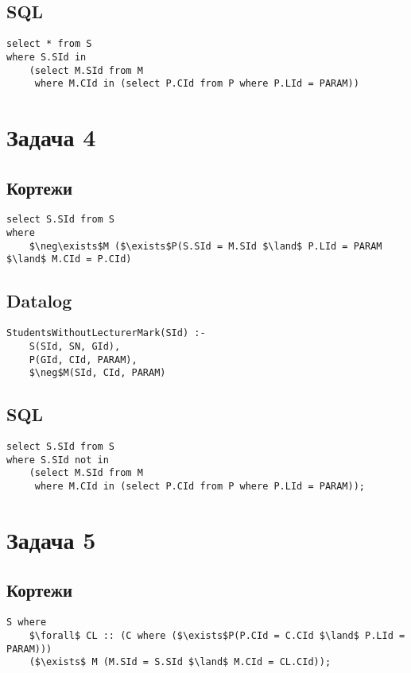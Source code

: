 \documentclass{article}
\begin{document}
\subsection{SQL}
\begin{lstlisting}[mathescape=true]
select * from S
where S.SId in
    (select M.SId from M
     where M.CId in (select P.CId from P where P.LId = PARAM))
\end{lstlisting}



\section{Задача 4}

\subsection{Кортежи}
\begin{lstlisting}[mathescape=true]
select S.SId from S
where
    $\neg\exists$M ($\exists$P(S.SId = M.SId $\land$ P.LId = PARAM $\land$ M.CId = P.CId)
\end{lstlisting}

\subsection{Datalog}
\begin{lstlisting}[mathescape=true]
StudentsWithoutLecturerMark(SId) :-
    S(SId, SN, GId),
    P(GId, CId, PARAM),
    $\neg$M(SId, CId, PARAM)
\end{lstlisting}


\subsection{SQL}
\begin{lstlisting}[mathescape=true]
select S.SId from S
where S.SId not in
    (select M.SId from M
     where M.CId in (select P.CId from P where P.LId = PARAM));
\end{lstlisting}



\section{Задача 5}

\subsection{Кортежи}
\begin{lstlisting}[mathescape=true]
S where
    $\forall$ CL :: (C where ($\exists$P(P.CId = C.CId $\land$ P.LId = PARAM)))
    ($\exists$ M (M.SId = S.SId $\land$ M.CId = CL.CId));
\end{lstlisting}
\end{document}
